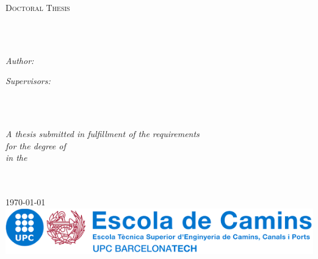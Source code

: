 \documentclass[
11pt,                   %
english,                %
singlespacing,          %
headsepline,            %
]{MastersDoctoralThesis}
\date{June 28, 2022}
\author{Miguel \textsc{Masó}} %
\begin{document}
\frontmatter %

\pagestyle{plain} %



\begin{titlepage}
\begin{center}

\vspace*{.06\textheight}
{\scshape\LARGE \univname\par}\vspace{1.5cm} %
\textsc{\Large Doctoral Thesis}\\[0.5cm] %

\HRule \\[0.4cm] %
{\huge \bfseries \ttitle\par}\vspace{0.4cm} %
\HRule \\[1.5cm] %
 
\begin{minipage}[t]{0.4\textwidth}
\begin{flushleft} \large
\emph{Author:}\\
\href{https://directori.upc.edu/directori/dadesPersona.jsp?id=1115243}{\authorname}
\end{flushleft}
\end{minipage}
\begin{minipage}[t]{0.4\textwidth}
\begin{flushright} \large
\emph{Supervisors:} \\
\href{http://www.cimne.com/eo}{\supname} \\
\href{https://www.cimne.com/1898/2181/people/directory}{\cosupname}
\end{flushright}
\end{minipage}\\[.3cm]
 
\vfill

\large \textit{A thesis submitted in fulfillment of the requirements\\ for the degree of \degreename}\\[0.3cm] %
\textit{in the}\\[0.3cm]
\groupname\\\deptname\\[.3cm] %
 
\vfill

{\large \today}\\[1cm]
\href{https://camins.upc.edu/}{
\includegraphics[width=.6\textwidth]{img/logo_caminos.png}
}
\vfill
\end{center}
\end{titlepage}
\end{document}
